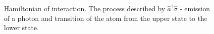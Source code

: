 \begin{figure}
\centering



\caption{Hamiltonian of interaction. The process described by $\hat{a}^{\dag}\hat{\sigma}$ - emission
  of a photon and transition of the atom from the upper state to the lower state.}
\label{figPart1Ch2_2_3}
\end{figure}